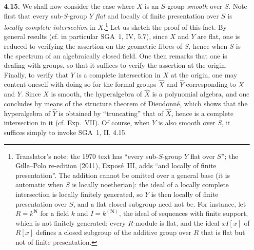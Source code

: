 \medskip
\noindent{}\textbf{4.15.}
We shall now consider the case where \(X\) is an \(S\)-group
\emph{smooth} over \(S\). Note first that every sub-\(S\)-group \(Y\)
\emph{flat} and locally of finite presentation over \(S\) is \emph{locally
complete intersection} in \(X\).\footnote{Translator's note: the 1970 text has
``every sub-\(S\)-group \(Y\) flat over \(S\)''; the Gille--Polo re-edition
(2011), Exposé~III, adds ``and locally of finite presentation''. The addition
cannot be omitted over a general base (it is automatic when \(S\) is locally
noetherian): the ideal of a locally complete intersection is locally finitely
generated, so \(Y\) is then locally of finite presentation over \(S\), and a
flat closed subgroup need not be. For instance, let \(R=k^{\mathbf N}\) for a
field \(k\) and \(I=k^{(\mathbf N)}\), the ideal of sequences with finite
support, which is not finitely generated; every \(R\)-module is flat, and the
ideal \(xI[x]\) of \(R[x]\) defines a closed subgroup of the additive group
over \(R\) that is flat but not of finite presentation.}
Let us sketch the proof of this fact. By general results (cf. in
particular SGA~1, IV, 5.7), since \(X\) and \(Y\) are flat, one is
reduced to verifying the assertion on the geometric fibres of \(S\),
hence when \(S\) is the spectrum of an algebraically closed field. One
then remarks that one is dealing with groups, so that it suffices to
verify the assertion at the origin. Finally, to verify that \(Y\) is a
complete intersection in \(X\) at the origin, one may content oneself
with doing so for the formal groups \(\widehat X\) and \(\widehat Y\)
corresponding to \(X\) and \(Y\). Since \(X\) is smooth, the
hyperalgebra of \(\widehat X\) is a polynomial algebra, and one concludes
by means of the structure theorem of Dieudonné, which shows that the
hyperalgebra of \(\widehat Y\) is obtained by ``truncating'' that of
\(\widehat X\), hence is a complete intersection in it (cf. Exp.~VII).
Of course, when \(Y\) is also smooth over \(S\), it suffices simply to
invoke SGA~1, II, 4.15.

